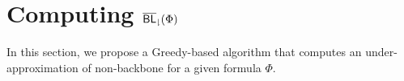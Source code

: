 \section{Computing ${\sf \overline{BL}_\downharpoonright}(\Phi)$}
In this section, we propose a Greedy-based algorithm that computes an under-approximation of non-backbone for a given formula
$\Phi$.


\medskip

\medskip

